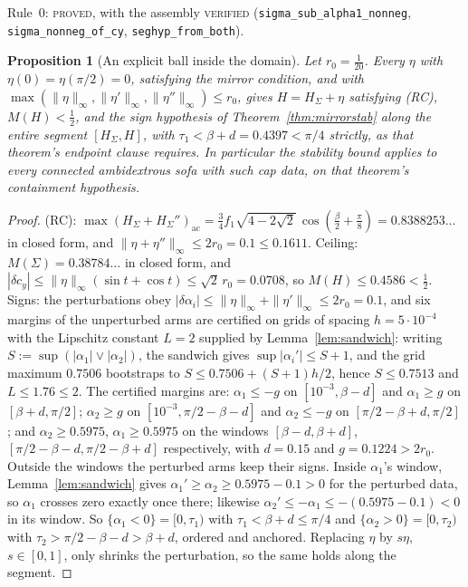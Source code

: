 \documentclass[11pt]{article}
\newtheorem{proposition}[theorem]{Proposition}
\theoremstyle{definition}
\newcommand{\Sig}{\Sigma}
\begin{document}
Rule~0: \textsc{proved}, with the assembly \textsc{verified}
(\verb|sigma_sub_alpha1_nonneg|, \verb|sigma_nonneg_of_cy|, \verb|seghyp_from_both|).

\begin{proposition}[An explicit ball inside the domain]\label{prop:ball}
Let $r_0=\tfrac1{20}$. Every $\eta$ with $\eta(0)=\eta(\pi/2)=0$, satisfying the mirror
condition, and with $\max(\|\eta\|_\infty,\|\eta'\|_\infty,\|\eta''\|_\infty)\le r_0$,
gives $H=H_\Sig+\eta$ satisfying (RC), $M(H)<\tfrac12$, and the sign hypothesis of
Theorem~\ref{thm:mirrorstab} along the entire segment $[H_\Sig,H]$, with
$\tau_1<\beta+d=0.4397<\pi/4$ strictly, as that theorem's endpoint clause requires. In
particular the stability bound applies to every connected ambidextrous sofa with such cap
data, on that theorem's containment hypothesis.
\end{proposition}

\begin{proof}
(RC): $\max(H_\Sig+H_\Sig'')_{\mathrm{ac}}=\tfrac34f_1\sqrt{4-2\sqrt2}\,
\cos(\tfrac\beta2+\tfrac\pi8)=0.8388253\ldots$ in closed form, and
$\|\eta+\eta''\|_\infty\le2r_0=0.1\le0.1611$. Ceiling: $M(\Sig)=0.38784\ldots$ in closed
form, and $|\delta c_y|\le\|\eta\|_\infty(\sin t+\cos t)\le\sqrt2\,r_0=0.0708$, so
$M(H)\le0.4586<\tfrac12$. Signs: the perturbations obey
$|\delta\alpha_i|\le\|\eta\|_\infty+\|\eta'\|_\infty\le2r_0=0.1$, and six margins of the
unperturbed arms are certified on grids of spacing $h=5\cdot10^{-4}$ with the Lipschitz
constant $L=2$ supplied by Lemma~\ref{lem:sandwich}: writing $S:=\sup(|\alpha_1|\vee
|\alpha_2|)$, the sandwich gives $\sup|\alpha_i'|\le S+1$, and the grid maximum $0.7506$
bootstraps to $S\le0.7506+(S+1)h/2$, hence $S\le0.7513$ and $L\le1.76\le2$. The certified
margins are: $\alpha_1\le-g$ on $[10^{-3},\beta-d]$ and $\alpha_1\ge g$ on
$[\beta+d,\pi/2]$; $\alpha_2\ge g$ on $[10^{-3},\pi/2-\beta-d]$ and $\alpha_2\le-g$ on
$[\pi/2-\beta+d,\pi/2]$; and $\alpha_2\ge0.5975$, $\alpha_1\ge0.5975$ on the windows
$[\beta-d,\beta+d]$, $[\pi/2-\beta-d,\pi/2-\beta+d]$ respectively, with $d=0.15$ and
$g=0.1224>2r_0$. Outside the windows the perturbed arms keep their signs. Inside
$\alpha_1$'s window, Lemma~\ref{lem:sandwich} gives
$\alpha_1'\ge\alpha_2\ge0.5975-0.1>0$ for the perturbed data, so $\alpha_1$ crosses zero
exactly once there; likewise $\alpha_2'\le-\alpha_1\le-(0.5975-0.1)<0$ in its window. So
$\{\alpha_1<0\}=[0,\tau_1)$ with $\tau_1<\beta+d\le\pi/4$ and
$\{\alpha_2>0\}=[0,\tau_2)$ with $\tau_2>\pi/2-\beta-d>\beta+d$, ordered and anchored.
Replacing $\eta$ by $s\eta$, $s\in[0,1]$, only shrinks the perturbation, so the same
holds along the segment.
\end{proof}
\end{document}
